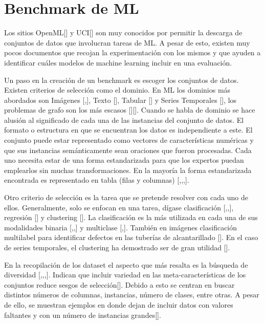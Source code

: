 \section{Benchmark de ML}\label{section:bench_ML}

Los sitios OpenML[\cite{43}] y UCI[\cite{45}] son muy conocidos por permitir la descarga de conjuntos de datos que involucran tareas de ML. A pesar de esto, 
existen muy pocos documentos que recojan la experimentación con los mismos y que ayuden a identificar cuáles modelos de machine learning incluir en una evaluación.

Un paso en la creación de un benchmark es escoger los conjuntos de datos. Existen criterios de selección como el dominio. En ML los dominios más abordados son 
Imágenes [\cite{1},\cite{3}], Texto [\cite{4}], Tabular [\cite{2}] y Series Temporales [\cite{7}], los problemas de grafo son los más escasos [\cite{5}][\cite{6}]. 
Cuando se habla de dominio se hace alusión al significado de cada una de las instancias del conjunto de datos. El formato o estructura en que se encuentran los datos 
es independiente a este. El conjunto puede estar representado como vectores de características numéricas y que sus instancias semánticamente sean oraciones que fueron 
procesadas. Cada uno necesita estar de una forma estandarizada para que los expertos puedan emplearlos sin muchas transformaciones. En la mayoría la forma estandarizada 
encontrada es representado en tabla (filas y columnas) [\cite{4},\cite{1},\cite{3},\cite{2}].

Otro criterio de selección es la tarea que se pretende resolver con cada uno de ellos. Generalmente, solo se enfocan en una tarea, dígase clasificación 
[\cite{4},\cite{1},\cite{3}], regresión [\cite{6}] y clustering [\cite{7}]. La clasificación es la más utilizada en cada una de sus modalidades binaria 
[\cite{4},\cite{2},\cite{5}] y multiclase [\cite{2},\cite{5}]. También en imágenes clasificación multilabel para identificar defectos en las tuberías de 
alcantarillado [\cite{3}]. En el caso de series temporales, el clustering ha demostrado ser de gran utilidad [\cite{7}].

En la recopilación de los dataset el aspecto que más resalta es la búsqueda de diversidad [\cite{4},\cite{2},\cite{6},\cite{7}]. Indican que incluir variedad en 
las meta-características de los conjuntos reduce sesgos de selección[\cite{2}]. Debido a esto se centran en buscar distintos números de columnas, instancias, número 
de clases, entre otras. A pesar de ello, se muestran ejemplos en donde dejan de incluir datos con valores faltantes y con un número de instancias grandes[\cite{2}].

